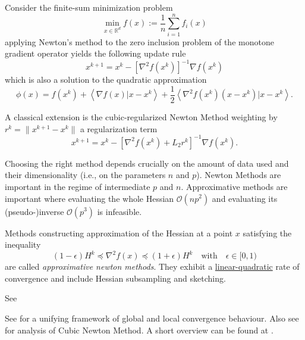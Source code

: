 \documentclass[preview, multi={definition, remark, theorem, proposition, example, literature}, border=0.2in]{standalone}
\newcommand{\innerp}[2]{\left\langle #1 \vert #2 \right\rangle}
\begin{document}
\begin{definition}[label=h9xvj58r, name=Newton Method]
	Consider the finite-sum minimization problem 
	\[
		\min_{x\in\mathbb R^d}f(x):=\frac{1}{n}\sum_{i=1}^{n}f_i(x)
	\]
	applying Newton's method to the zero inclusion problem of the monotone gradient operator yields the following update rule
	\[
		x^{k+1}=x^k - [\nabla^2 f(x^k)]^{-1}\nabla f(x^k)
	\]
	which is also a solution to the quadratic approximation
	\[
		\phi(x) = f(x^k) + \innerp{\nabla f(x)}{x-x^k}+\frac{1}{2}\innerp{\nabla^2 f(x^k)(x-x^k)}{x-x^k}.
	\]

	A classical extension is the cubic-regularized Newton Method weighting by \( r^k = \lVert x^{k+1} - x^k\rVert \) a regularization term
	\[
		x^{k+1}=x^k - [\nabla^2 f(x^k) + L_2r^k]^{-1}\nabla f(x^k).
	\]

	Choosing the right method depends crucially on the amount of data used and their dimensionality (i.e., on the parameters \(n\) and \(p\)). Newton Methods are important in the regime of intermediate \( p \) and \( n \). Approximative methods are important where evaluating the whole Hessian \( \mathcal O(np^2) \) and evaluating its (pseudo-)inverse \( \mathcal O(p^3) \) is infeasible.

	\begin{definition}[label=pd12rq4h, name=Approximate Newton Methods]
		Methods constructing approximation of the Hessian at a point \( x \) satisfying the inequality
		\[
			(1-\epsilon)H^k \preceq \nabla^2 f(x) \preceq (1+\epsilon)H^k \quad \text{with}\quad\epsilon\in[0,1)
		\]
		are called \emph{approximative newton methods}. They exhibit a \hyperref[v_o4l6wn]{linear-quadratic} rate of convergence and include Hessian subsampling and sketching.
		\begin{example}[label=vx9hm059, name=NewSamp]
			See \cite{newsamp}
		\end{example}

		\begin{literature}[label=zcwoa_s7, name=Unified Analysis Framework]
			See \cite{approximate_newton_method} for a unifying framework of global and local convergence behaviour. Also see \cite{unified_convergence_cubic_newton} for analysis of Cubic Newton Method. A short overview can be found at \cite{approximate_newton_liu}.
		\end{literature}
	\end{definition}
\end{definition}
\end{document}
